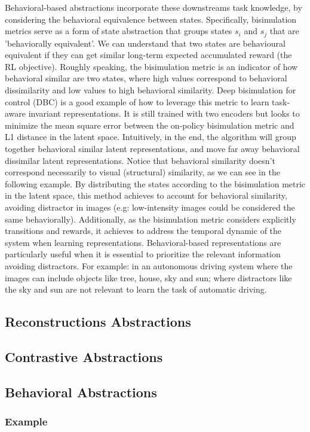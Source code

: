 Behavioral-based abstractions incorporate these downstreams task knowledge, by considering the behavioral equivalence between states. Specifically, bisimulation metrics serve as a form of state abstraction that groups states \(s_i\) and \(s_j\) that are 'behaviorally equivalent'. We can understand that two states are behavioural equivalent if they can get similar long-term expected accumulated reward (the RL objective). Roughly speaking, the bisimulation metric is an indicator of how behavioral similar are two states, where high values correspond to behavioral dissimilarity and low values to high behavioral similarity.  Deep bisimulation for control (DBC) is a good example of how to leverage this metric to learn task-aware invariant representations. It is still trained with two encoders but looks to minimize the mean square error between the on-policy bisimulation metric and L1 distance in the latent space. Intuitively, in the end, the algorithm will group together behavioral similar latent representations, and move far away behavioral dissimilar latent representations. Notice that behavioral similarity doesn’t correspond necessarily to visual (structural) similarity, as we can see in the following example. By distributing the states according to the bisimulation metric in the latent space, this method achieves to account for behavioral similarity, avoiding distractor in images (e.g: low-intensity images could be considered the same behaviorally). Additionally, as the bisimulation metric considers explicitly transitions and rewards, it achieves to address the temporal dynamic of the system when learning representations. Behavioral-based representations are particularly useful when it is essential to prioritize the relevant information avoiding distractors. For example: in an autonomous driving system where the images can include objects like tree, house, sky and sun; where distractors like the sky and sun are not relevant to learn the task of automatic driving.

\subsection{Reconstructions Abstractions}
\subsection{Contrastive Abstractions}
\subsection{Behavioral Abstractions}
\subsubsection{Example}